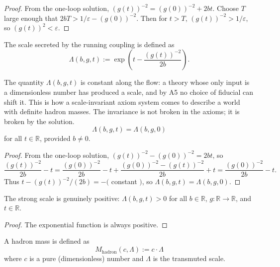 \begin{proof}
From the one-loop solution, $(g(t))^{-2} = (g(0))^{-2} + 2bt$. Choose $T$ large enough that $2bT > 1/\varepsilon - (g(0))^{-2}$. Then for $t > T$, $(g(t))^{-2} > 1/\varepsilon$, so $(g(t))^2 < \varepsilon$.
\end{proof}

\begin{definition}
The scale secreted by the running coupling is defined as
\begin{equation}
\Lambda(b, g, t) := \exp\left(t - \frac{(g(t))^{-2}}{2b}\right) .
\end{equation}
\end{definition}

\begin{theorem}
The quantity $\Lambda(b, g, t)$ is constant along the flow: a theory whose only input is a dimensionless number has produced a scale, and by A5 no choice of fiducial can shift it. This is how a scale-invariant axiom system comes to describe a world with definite hadron masses. The invariance is not broken in the axioms; it is broken by the solution.
\begin{equation}
\Lambda(b, g, t) = \Lambda(b, g, 0)
\end{equation}
for all $t \in \mathbb{R}$, provided $b \neq 0$.
\end{theorem}

\begin{proof}
From the one-loop solution, $(g(t))^{-2} - (g(0))^{-2} = 2bt$, so
\begin{equation}
\frac{(g(t))^{-2}}{2b} - t = \frac{(g(0))^{-2}}{2b} - t + \frac{(g(0))^{-2} - (g(t))^{-2}}{2b} + t = \frac{(g(0))^{-2}}{2b} - t .
\end{equation}
Thus $t - (g(t))^{-2}/(2b) = -($ constant $)$, so $\Lambda(b, g, t) = \Lambda(b, g, 0)$.
\end{proof}

\begin{theorem}
The strong scale is genuinely positive: $\Lambda(b, g, t) > 0$ for all $b \in \mathbb{R}$, $g : \mathbb{R} \to \mathbb{R}$, and $t \in \mathbb{R}$.
\end{theorem}

\begin{proof}
The exponential function is always positive.
\end{proof}

\begin{definition}
A hadron mass is defined as
\begin{equation}
M_{\text{hadron}}(c, \Lambda) := c \cdot \Lambda
\end{equation}
where $c$ is a pure (dimensionless) number and $\Lambda$ is the transmuted scale.
\end{definition}

